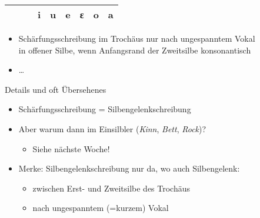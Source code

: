 \begin{frame}
{\begin{tabular}{lllllllll}
      \midrule
      & & & \textbf{i} & \textbf{u} & \textbf{e} & \textbf{ε} & \textbf{o} & \textbf{a} \\

      \bottomrule
    \end{tabular}
  }
  \Halbzeile\pause
  \begin{itemize}[<+->]
    \item \alert{Schärfungsschreibung im Trochäus nur nach ungespanntem Vokal\\
      in offener Silbe, wenn Anfangsrand der Zweitsilbe konsonantisch}
    \item \ldots\ 
  \end{itemize}
\end{frame}

\begin{frame}
  {Details und oft Übersehenes}
  \pause
  \begin{itemize}[<+->]
    \item \alert{Schärfungsschreibung = Silbengelenkschreibung}
    \item Aber warum dann im Einsilbler (\textit{Kinn}, \textit{Bett}, \textit{Rock})?
      \begin{itemize}[<+->]
        \item Siehe nächste Woche!
      \end{itemize}
      \Halbzeile
    \item Merke: Silbengelenkschreibung nur da, wo auch Silbengelenk:
      \begin{itemize}[<+->]
        \item \alert{zwischen Erst- und Zweitsilbe des Trochäus}
        \item \alert{nach ungespanntem} (=kurzem) \alert{Vokal}
      \end{itemize}
  \end{itemize}
\end{frame}

